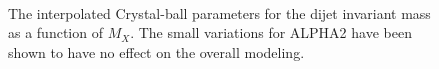 \begin{figure}[h!]
\\
\caption{The interpolated Crystal-ball parameters for the dijet invariant mass as a function of $M_X$. The small variations for ALPHA2 have been shown to have no effect on the overall modeling.}
\label{fig:MVVShapeParam}
\end{figure}


